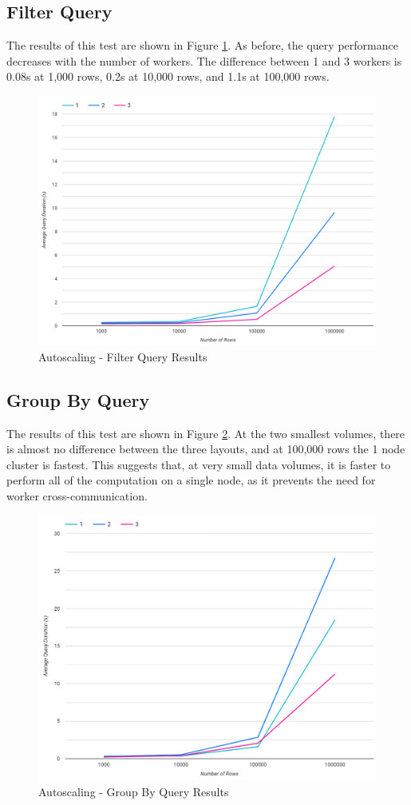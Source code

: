 \subsection{Filter Query}
The results of this test are shown in Figure \ref{fig:filter-simple-autoscale-test}. As before, the query performance decreases with the number of workers. The difference between 1 and 3 workers is 0.08s at 1,000 rows, 0.2s at 10,000 rows, and 1.1s at 100,000 rows.

\begin{figure}[ht]
	\centering
	\includegraphics[width=0.8\linewidth]{chapters/diagrams/testing/filter-simple-autoscale-test}
	\caption{Autoscaling - Filter Query Results}
	\label{fig:filter-simple-autoscale-test}
\end{figure}

\pagebreak
\subsection{Group By Query}
The results of this test are shown in Figure \ref{fig:group-by-simple-autoscale-test}. At the two smallest volumes, there is almost no difference between the three layouts, and at 100,000 rows the 1 node cluster is fastest. This suggests that, at very small data volumes, it is faster to perform all of the computation on a single node, as it prevents the need for worker cross-communication.

\begin{figure}[ht]
	\centering
	\includegraphics[width=0.8\linewidth]{chapters/diagrams/testing/group-by-simple-autoscale-test}
	\caption{Autoscaling - Group By Query Results}
	\label{fig:group-by-simple-autoscale-test}
\end{figure}


